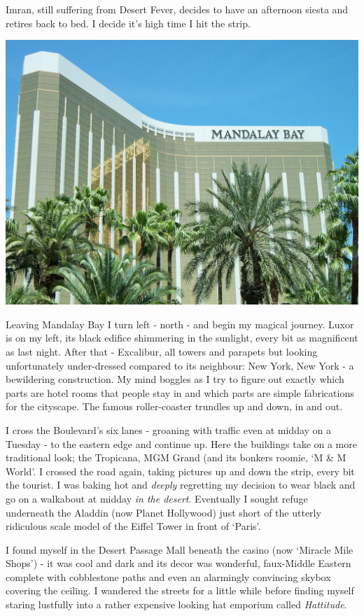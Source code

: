 \documentclass[a5paper,titlepage,11pt,draft]{book}
\begin{document}
Imran, still suffering from Desert Fever, decides to have an afternoon siesta and retires back to bed.  I decide it's high time I hit the strip.

\begin{center}\includegraphics[width=\textwidth]{gfx/100_1388}\end{center}

Leaving Mandalay Bay I turn left - north - and begin my magical journey.  Luxor is on my left, its black edifice shimmering in the sunlight, every bit as magnificent as last night.  After that - Excalibur, all towers and parapets but looking unfortunately under-dressed compared to its neighbour: New York, New York - a bewildering construction.  My mind boggles as I try to figure out exactly which parts are hotel rooms that people stay in and which parts are simple fabrications for the cityscape.  The famous roller-coaster trundles up and down, in and out.

I cross the Boulevard's six lanes - groaning with traffic even at midday on a Tuesday - to the eastern edge and continue up. Here the buildings take on a more traditional look; the Tropicana, MGM Grand (and its bonkers roomie, `M \& M World'.  I crossed the road again, taking pictures up and down the strip, every bit the tourist.  I was baking hot and \emph{deeply} regretting my decision to wear black and go on a walkabout at midday \emph{in the desert}.  Eventually I sought refuge underneath the Aladdin (now Planet Hollywood) just short of the utterly ridiculous scale model of the Eiffel Tower in front of `Paris'.

I found myself in the Desert Passage Mall beneath the casino (now `Miracle Mile Shops') - it was cool and dark and its decor was wonderful, faux-Middle Eastern complete with cobblestone paths and even an alarmingly convincing skybox covering the ceiling.  I wandered the streets for a little while before finding myself staring lustfully into a rather expensive looking hat emporium called \emph{Hattitude}.
\end{document}
